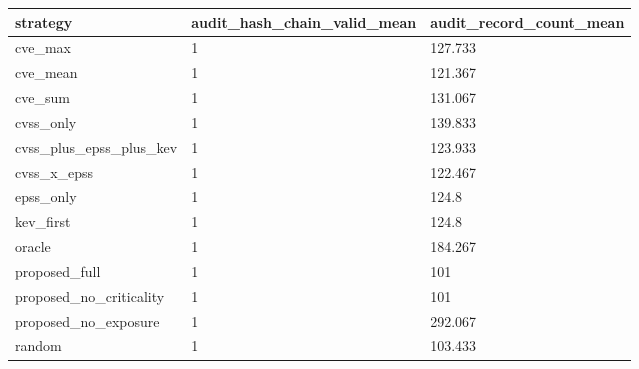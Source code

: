 \begin{tabular}{l l l}
\hline
strategy & audit\_hash\_chain\_valid\_mean & audit\_record\_count\_mean \\
\hline
cve\_max & 1 & 127.733 \\
cve\_mean & 1 & 121.367 \\
cve\_sum & 1 & 131.067 \\
cvss\_only & 1 & 139.833 \\
cvss\_plus\_epss\_plus\_kev & 1 & 123.933 \\
cvss\_x\_epss & 1 & 122.467 \\
epss\_only & 1 & 124.8 \\
kev\_first & 1 & 124.8 \\
oracle & 1 & 184.267 \\
proposed\_full & 1 & 101 \\
proposed\_no\_criticality & 1 & 101 \\
proposed\_no\_exposure & 1 & 292.067 \\
random & 1 & 103.433 \\
\hline
\end{tabular}
